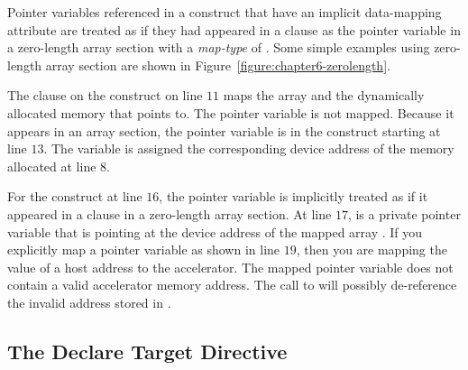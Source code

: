 
Pointer variables referenced in a  construct that have an implicit
data-mapping attribute are treated as if they had appeared in a 
clause as the pointer variable in a zero-length array section with a
\emph{map-type} of .  Some simple examples using zero-length array
section are shown in Figure~\ref{figure:chapter6-zerolength}.

The  clause on the  construct on line $11$ maps the
array  and the dynamically allocated memory that  points to.  The pointer
variable  is not mapped.  Because it appears in an array section, the
pointer variable  is  in the  construct starting at line
$13$.  The  variable  is assigned the corresponding device address of
the memory allocated at line $8$.


For the  construct at line $16$, the pointer variable  is
implicitly treated as if it appeared in a  clause in a zero-length
array section.  At line $17$,  is a private pointer variable that is pointing
at the device address of the mapped array .  If you explicitly map a pointer
variable as shown in line $19$, then you are mapping the value of a host
address to the accelerator.  The mapped pointer variable does not contain a
valid accelerator memory address.  The call to  will possibly de-reference
the invalid address stored in .

\subsection{The Declare Target Directive}
\label{sec:06.declare-target-construct}

